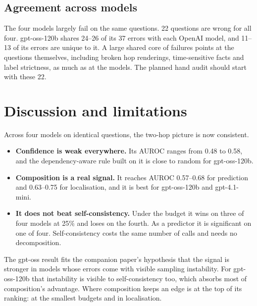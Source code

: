 \documentclass[11pt]{article}
\begin{document}
\subsection{Agreement across models}
The four models largely fail on the same questions. 22 questions are wrong for all four.
gpt-oss-120b shares 24--26 of its 37 errors with each OpenAI model, and 11--13 of its
errors are unique to it. A large shared core of failures points at the questions
themselves, including broken hop renderings, time-sensitive facts and label strictness, as
much as at the models. The planned hand audit should start with these 22.

\section{Discussion and limitations}

Across four models on identical questions, the two-hop picture is now consistent.
\begin{itemize}
  \item \textbf{Confidence is weak everywhere.} Its AUROC ranges from 0.48 to 0.58, and
        the dependency-aware rule built on it is close to random for gpt-oss-120b.
  \item \textbf{Composition is a real signal.} It reaches AUROC 0.57--0.68 for prediction
        and 0.63--0.75 for localisation, and it is best for gpt-oss-120b and gpt-4.1-mini.
  \item \textbf{It does not beat self-consistency.} Under the budget it wins on three of
        four models at 25\% and loses on the fourth. As a predictor it is significant on
        one of four. Self-consistency costs the same number of calls and needs no
        decomposition.
\end{itemize}
The gpt-oss result fits the companion paper's hypothesis that the signal is stronger in
models whose errors come with visible sampling instability. For gpt-oss-120b that
instability is visible to self-consistency too, which absorbs most of composition's
advantage. Where composition keeps an edge is at the top of its ranking: at the smallest
budgets and in localisation.
\end{document}
